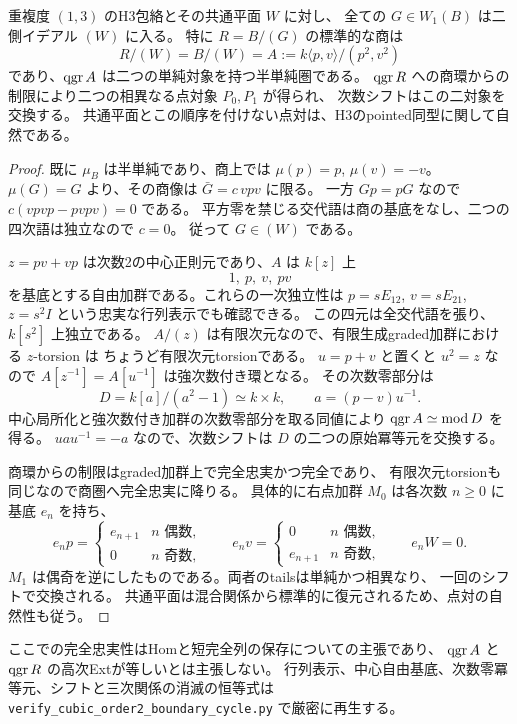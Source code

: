 \begin{proposition}[標準的な二周期点対と三次関係の消滅]
\label{prop:h3-order2-canonical-two-cycle}
重複度 $(1,3)$ のH3包絡とその共通平面 $W$ に対し、
全ての $G\in W_1(B)$ は二側イデアル $(W)$ に入る。
特に $R=B/(G)$ の標準的な商は
\[
 R/(W)=B/(W)=A:=k\langle p,v\rangle/(p^2,v^2)
\]
であり、$\operatorname{qgr} A$ は二つの単純対象を持つ半単純圏である。
$\operatorname{qgr} R$ への商環からの制限により二つの相異なる点対象 $P_0,P_1$ が得られ、
次数シフトはこの二対象を交換する。
共通平面とこの順序を付けない点対は、H3のpointed同型に関して自然である。
\end{proposition}
\begin{proof}
既に $\mu_B$ は半単純であり、商上では $\mu(p)=p$, $\mu(v)=-v$。
$\mu(G)=G$ より、その商像は $\bar G=c\,vpv$ に限る。
一方 $Gp=pG$ なので
$c(vpvp-pvpv)=0$ である。
平方零を禁じる交代語は商の基底をなし、二つの四次語は独立なので $c=0$。
従って $G\in(W)$ である。

$z=pv+vp$ は次数2の中心正則元であり、$A$ は $k[z]$ 上
\[
 1,\ p,\ v,\ pv
\]
を基底とする自由加群である。これらの一次独立性は
$p=sE_{12}$, $v=sE_{21}$, $z=s^2I$ という忠実な行列表示でも確認できる。
この四元は全交代語を張り、$k[s^2]$ 上独立である。
$A/(z)$ は有限次元なので、有限生成graded加群における $z$-torsion は
ちょうど有限次元torsionである。
$u=p+v$ と置くと $u^2=z$ なので $A[z^{-1}]=A[u^{-1}]$ は強次数付き環となる。
その次数零部分は
\[
 D=k[a]/(a^2-1)\simeq k\times k,\qquad a=(p-v)u^{-1}.
\]
中心局所化と強次数付き加群の次数零部分を取る同値により
$\operatorname{qgr} A\simeq\operatorname{mod}D$ を得る。
$uau^{-1}=-a$ なので、次数シフトは $D$ の二つの原始冪等元を交換する。

商環からの制限はgraded加群上で完全忠実かつ完全であり、
有限次元torsionも同じなので商圏へ完全忠実に降りる。
具体的に右点加群 $M_0$ は各次数 $n\ge0$ に基底 $e_n$ を持ち、
\[
 e_np=\begin{cases}e_{n+1}&n\text{ 偶数},\\0&n\text{ 奇数},\end{cases}
 \qquad
 e_nv=\begin{cases}0&n\text{ 偶数},\\e_{n+1}&n\text{ 奇数},\end{cases}
 \qquad e_nW=0.
\]
$M_1$ は偶奇を逆にしたものである。両者のtailsは単純かつ相異なり、
一回のシフトで交換される。
共通平面は混合関係から標準的に復元されるため、点対の自然性も従う。
\end{proof}
ここでの完全忠実性はHomと短完全列の保存についての主張であり、
$\operatorname{qgr} A$ と $\operatorname{qgr} R$ の高次Extが等しいとは主張しない。
行列表示、中心自由基底、次数零冪等元、シフトと三次関係の消滅の恒等式は
\texttt{verify\_\allowbreak{}cubic\_\allowbreak{}order2\_\allowbreak{}boundary\_\allowbreak{}cycle.py}
で厳密に再生する。

